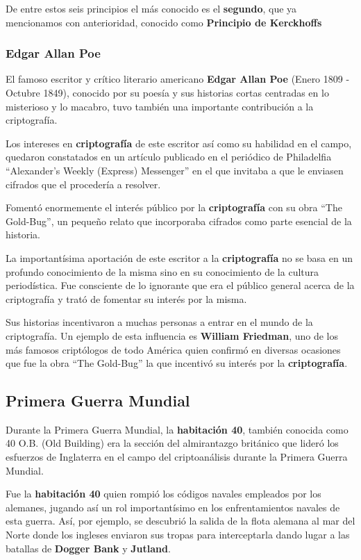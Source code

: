 \documentclass[nochap]{apuntesURJC}
\begin{document}
De entre estos seis principios el más conocido es el \textbf{segundo}, que ya mencionamos con anterioridad, conocido como \textbf{Principio de Kerckhoffs}

\subsubsection{Edgar Allan Poe}
El famoso escritor y crítico literario americano \textbf{Edgar Allan Poe} (Enero 1809 - Octubre 1849), conocido por su poesía y sus historias cortas centradas en lo misterioso y lo macabro, tuvo también una importante contribución a la criptografía.

Los intereses en \textbf{criptografía} de este escritor así como su habilidad en el campo, quedaron constatados en un artículo publicado en el periódico de Philadelfia ``Alexander's Weekly (Express) Messenger'' en el que invitaba a que le enviasen cifrados que el procedería a resolver.

Fomentó enormemente el interés público por la \textbf{criptografía} con su obra ``The Gold-Bug'', un pequeño relato que incorporaba cifrados como parte esencial de la historia.

La importantísima aportación de este escritor a la \textbf{criptografía} no se basa en un profundo conocimiento de la misma sino en su conocimiento de la cultura periodística. Fue consciente de lo ignorante que era el público general acerca de la criptografía y trató de fomentar su interés por la misma.

Sus historias incentivaron a muchas personas a entrar en el mundo de la criptografía. Un ejemplo de esta influencia es \textbf{William Friedman}, uno de los más famosos criptólogos de todo América quien confirmó en diversas ocasiones que fue la obra ``The Gold-Bug'' la que incentivó su interés por la \textbf{criptografía}.

\subsection{Primera Guerra Mundial}
Durante la Primera Guerra Mundial, la \textbf{habitación 40}, también conocida como 40 O.B. (Old Building) era la sección del almirantazgo británico que lideró los esfuerzos de Inglaterra en el campo del criptoanálisis durante la Primera Guerra Mundial.

Fue la \textbf{habitación 40} quien rompió los códigos navales empleados por los alemanes, jugando así un rol importantísimo en los enfrentamientos navales de esta guerra. Así, por ejemplo, se descubrió la salida de la flota alemana al mar del Norte donde los ingleses enviaron sus tropas para interceptarla dando lugar a las batallas de \textbf{Dogger Bank} y \textbf{Jutland}.
\end{document}
